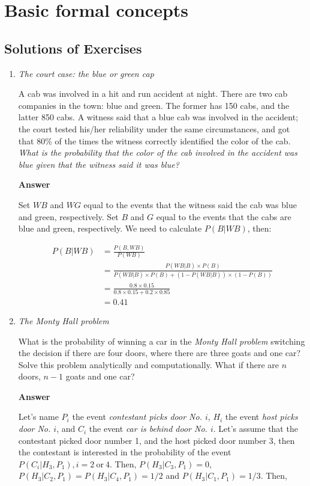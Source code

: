 \chapter{Basic formal concepts}\label{chap1}
\section*{Solutions of Exercises}\label{sec11}
\begin{enumerate}[leftmargin=*]
\item \textit{The court case: the blue or green cap}
	
A cab was involved in a hit and run accident at night. There are two cab companies in the town: blue and green. The former has 150 cabs, and the latter 850 cabs. A witness said that a blue cab was involved in the accident; the court tested his/her reliability under the same circumstances, and got that 80\% of the times the witness correctly identified the color of the cab. \textit{What is the probability that the color of the cab involved in the accident was blue given that the witness said it was blue?}
	
\textbf{Answer}
	
Set $WB$ and $WG$ equal to the events that the witness said the cab was blue and green, respectively. Set $B$ and $G$ equal to the events that the cabs are blue and green, respectively. We need to calculate $P(B|WB)$, then:
	
\begin{align}
	P(B|WB)&=\frac{P(B,WB)}{P(WB)}\\
	&=\frac{P(WB|B)\times P(B)}{P(WB|B)\times P(B)+(1-P(WB|B))\times (1-P(B))}\nonumber\\
	&=\frac{0.8\times 0.15}{0.8\times 0.15+0.2\times 0.85}\nonumber\\
	&=0.41\nonumber
\end{align}
	
	
\item \textit{The Monty Hall problem}
	
What is the probability of winning a car in the \textit{Monty Hall problem} switching the decision if there are four doors, where there are three goats and one car? Solve this problem analytically and computationally.  What if there are $n$ doors, $n-1$ goats and one car?
	
\textbf{Answer}
	
Let's name $P_i$ the event \textit{contestant picks door No. $i$}, $H_i$ the event \textit{host picks door No. $i$}, and $C_i$ the event \textit{car is behind door No. $i$}. Let's assume that the contestant picked door number 1, and the host picked door number 3, then the contestant is interested in the probability of the event $P(C_i|H_3,P_1), i = 2 \ \text{or} \ 4$. Then, $P(H_3|C_3,P_1)=0$, $P(H_3|C_2,P_1)=P(H_3|C_4,P_1)=1/2$ and $P(H_3|C_1,P_1)=1/3$. Then,  
	

\end{enumerate}
